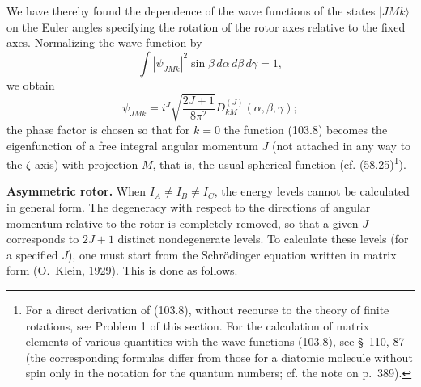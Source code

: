 We have thereby found the dependence of the wave functions of the states $|JMk\rangle$ on the Euler angles specifying the rotation of the rotor axes relative to the fixed axes. Normalizing the wave function by
\[
 \int|\psi_{JMk}|^2\sin\beta\,d\alpha\,d\beta\,d\gamma=1,
\]
we obtain
\begin{equation}
 \psi_{JMk}=i^J\sqrt{\frac{2J+1}{8\pi^2}}D_{kM}^{(J)}(\alpha,\beta,\gamma); \tag{103.8}
\end{equation}
the phase factor is chosen so that for $k=0$ the function (103.8) becomes the eigenfunction of a free integral angular momentum $J$ (not attached in any way to the $\zeta$ axis) with projection $M$, that is, the usual spherical function (cf. (58.25)\footnote{For a direct derivation of (103.8), without recourse to the theory of finite rotations, see Problem 1 of this section. For the calculation of matrix elements of various quantities with the wave functions (103.8), see \S~110, 87 (the corresponding formulas differ from those for a diatomic molecule without spin only in the notation for the quantum numbers; cf. the note on p.~389).}).

\textbf{Asymmetric rotor.} When $I_A\ne I_B\ne I_C$, the energy levels cannot be calculated in general form. The degeneracy with respect to the directions of angular momentum relative to the rotor is completely removed, so that a given $J$ corresponds to $2J+1$ distinct nondegenerate levels. To calculate these levels (for a specified $J$), one must start from the Schrödinger equation written in matrix form (O.~Klein, 1929). This is done as follows.

